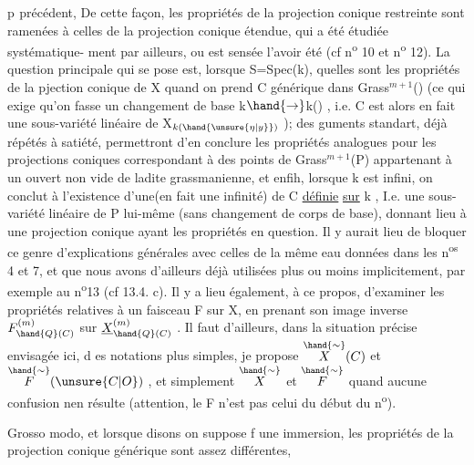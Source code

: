 
p$_{}$ précédent, 
 De cette façon, les propriétés de
la projection conique  restreinte  sont ramenées  à
celles de la projection conique étendue, qui a été  étudiée systématique-%
ment par ailleurs, ou est sensée l'avoir été (cf n\textsuperscript{o} 10 et n\textsuperscript{o} 12). La
question principale qui se pose est, lorsque  S=Spec(k), quelles sont
les propriétés de la pjection conique  de X  quand on prend C générique
dans Grass$^{m+1}$() (ce qui exige  qu'on fasse un changement de base
k$\hand{\rightarrow}$k() , i.e.  C est alors en fait une sous-variété linéaire de X$_{k(\hand{\unsure{\eta|y}})}$ ); des
guments  standart, déjà répétés à satiété, permettront d'en conclure
les propriétés analogues pour les projections coniques correspondant à 
des points de Grass$^{m+1}$(P)  appartenant à un ouvert non vide de ladite
grassmanienne, et enfih, lorsque k est infini, on conclut à l'existence
d'une(en fait une infinité) de  C  \uline{définie} \uline{sur} k , I.e.  une sous-variété
linéaire de P lui-même (sans changement de corps de base), donnant lieu
à une projection conique ayant les propriétés en question. Il y aurait
\placedmargin{|} lieu de bloquer ce genre d'explications générales avec celles de la même
eau données dans les n\textsuperscript{os} 4 et 7, et que nous avons d'ailleurs déjà
utilisées plus ou moins implicitement,  par exemple au n\textsuperscript{o}13 
 (cf 13.4. c). Il y a lieu également, à ce propos, d'examiner les
propriétés relatives à un faisceau F sur X,  en prenant son image inverse
$F^{(m)}_{\hand{Q}(C)}$  sur  $\underline{X}^{(m)}_{\hand{Q}(C)}$ . Il faut  d'ailleurs, dans la situation précise
envisagée ici, d es notations plus simples, je propose  $\overset{\hand{\sim}}{X}(C)$ et $\overset{\hand{\sim}}{F}(\unsure{C|O})$ ,
et simplement $\overset{\hand{\sim}}{X}$ et $\overset{\hand{\sim}}{F}$  quand aucune confusion nen résulte  (attention, le
F   n'est pas  celui du début du n\textsuperscript{o}).

Grosso modo, et lorsque  disons on suppose  f une immersion, les
propriétés de la projection conique générique sont assez différentes,

